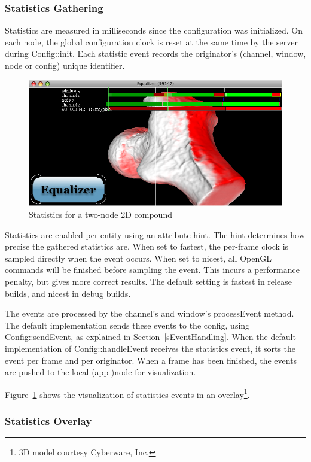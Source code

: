 \documentclass[10pt,a4]{scrartcl}
\newcommand{\fig}[1]{Figure~\ref{#1}}
\newcommand{\sref}[1]{Section~\ref{#1}}
\begin{document}
\subsubsection{Statistics Gathering}

Statistics are measured in milliseconds since the configuration was
initialized. On each node, the global configuration clock is reset at
the same time by the server during \textsf{Config::init}. Each statistic
event records the originator's (channel, window, node or config) unique
identifier.

\begin{figure}
  \includegraphics[width=.618\textwidth]{images/statistics.png}
  {\caption{\label{fStatistics}Statistics for a two-node 2D compound}}
\end{figure}
Statistics are enabled per entity using an attribute hint. The hint
determines how precise the gathered statistics are. When set to
\textsf{fastest}, the per-frame clock is sampled directly when the event
occurs. When set to \textsf{nicest}, all OpenGL commands will be
finished before sampling the event. This incurs a performance penalty,
but gives more correct results. The default setting is fastest in
release builds, and nicest in debug builds.

The events are processed by the channel's and window's
\textsf{processEvent} method. The default implementation sends these
events to the config, using \textsf{Config::sendEvent}, as explained in
\sref{sEventHandling}. When the default implementation of
\textsf{Config::handleEvent} receives the statistics event, it sorts the
event per frame and per originator. When a frame has been finished, the
events are pushed to the local (app-)node for visualization.

\fig{fStatistics} shows the visualization of statistics events in an
overlay\footnote{3D model courtesy Cyberware, Inc.}.

\subsubsection{Statistics Overlay}
\end{document}
